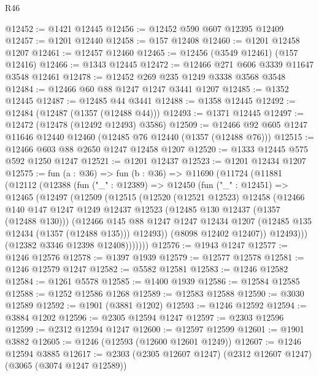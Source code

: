 \begin{lexlean}{R46}
\begin{coremodule}
@12452 := @1421 @12445
@12456 := @12452 @590 @607 @12395 @12409
@12457 := @1201 @12440
@12458 := @157 @12408
@12460 := @1201 @12458 @1207
@12461 := @12457 @12460
@12465 := @12456 (@3549 @12461) (@157 @12416)
@12466 := @1343 @12445
@12472 := @12466 @271 @606 @3339 @11647 @3548 @12461
@12478 := @12452 @269 @235 @1249 @3338 @3568 @3548
@12484 := @12466 @60 @88 @1247 @1247 @3441 @1207
@12485 := @1352 @12445
@12487 := @12485 @44 @3441
@12488 := @1358 @12445
@12492 := @12484 (@12487 (@1357 (@12488 @44)))
@12493 := @1371 @12445
@12497 := @12472 (@12478 (@12492 @12493) @3586)
@12509 := @12466 @92 @605 @1247 @11646 @12440 @12460 (@12485 @76 @12440 (@1357 (@12488 @76)))
@12515 := @12466 @603 @88 @2650 @1247 @12458 @1207
@12520 := @1333 @12445 @575 @592 @1250 @1247
@12521 := @1201 @12437
@12523 := @1201 @12434 @1207
@12575 := fun (a : @36) =>
  fun (b : @36) =>
  @11690
    (@11724
      (@11881
        (@12112
          (@12388
            (fun ("_" : @12389) =>
            @12450
              (fun ("_" : @12451) =>
              @12465
                (@12497
                  (@12509
                    (@12515
                      (@12520
                        (@12521 @12523)
                        @12458
                        (@12466
                          @140
                          @147
                          @1247
                          @1249
                          @12437
                          @12523
                          (@12485 @130 @12437 (@1357 (@12488 @130)))
                          (@12466
                            @145
                            @88
                            @1247
                            @1247
                            @12434
                            @1207
                            (@12485 @135 @12434 (@1357 (@12488 @135)))
                            @12493))
                        (@8098 @12402 @12407))
                      @12493)))
                (@12382 @3346 @12398 @12408)))))))
@12576 := @1943 @1247
@12577 := @1246 @12576
@12578 := @1397 @1939
@12579 := @12577 @12578
@12581 := @1246 @12579 @1247
@12582 := @5582 @12581
@12583 := @1246 @12582
@12584 := @1261 @5578
@12585 := @1400 @1939
@12586 := @12584 @12585
@12588 := @1252 @12586 @1268
@12589 := @12583 @12588
@12590 := @3030 @12589
@12592 := @1901 (@3881 @1202)
@12593 := @1246 @12592
@12594 := @3884 @1202
@12596 := @2305 @12594 @1247
@12597 := @2303 @12596
@12599 := @2312 @12594 @1247
@12600 := @12597 @12599
@12601 := @1901 @3882
@12605 := @1246 (@12593 (@12600 @12601 @1249))
@12607 := @1246 @12594 @3885
@12617 := @2303 (@2305 @12607 @1247) (@2312 @12607 @1247) (@3065 (@3074 @1247 @12589))

\end{coremodule}
\end{lexlean}
